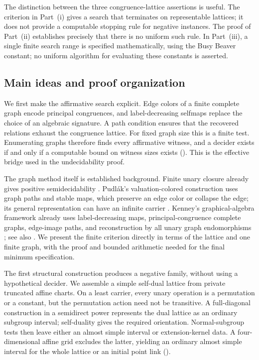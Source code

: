 The distinction between the three congruence-lattice assertions is useful.
The criterion
in Part~\textup{(i)} gives a search that terminates on representable
lattices; it does not provide a computable stopping rule for negative
instances.  The proof of Part~\textup{(ii)} establishes precisely that
there is no uniform such rule.  In Part~\textup{(iii)}, a single finite
search range is specified mathematically, using the Busy Beaver
constant; no uniform algorithm for evaluating these constants is asserted.

\subsection{Main ideas and proof organization}

We first make the affirmative search explicit.  Edge colors of a finite
complete graph encode principal congruences, and label-decreasing
selfmaps replace the choice of an algebraic signature.  A path condition
ensures that the recovered relations exhaust the congruence lattice.
For fixed graph size this is a finite test.  Enumerating graphs therefore
finds every affirmative witness, and a decider exists if and only if a
computable bound on witness sizes exists ().  This is the
effective bridge used in the undecidability proof.

The graph method itself is established background.  Finite unary closure
already gives positive semidecidability
\citep[Section~3.2, Theorem~3.2.1]{DeMeo2012}.  Pudl\'ak's
valuation-colored construction uses graph paths and stable maps, which
preserve an edge color or collapse the edge; its general representation
can have an infinite carrier \citep[pp.~270--272]{Pudlak1976}.
Kenney's graphical-algebra framework already uses label-decreasing maps,
principal-congruence complete graphs, edge-image paths, and reconstruction
by all unary graph endomorphisms
\citep{Kenney2010}; see also \citet[pp.~51--58]{Kenney2009Slides}.
We present the finite criterion directly in terms of the lattice and one
finite graph, with the proof and bounded arithmetic needed for the final
minimum specification.

The first structural construction produces a negative family, without
using a hypothetical decider.  We assemble a simple self-dual lattice
from private truncated affine charts.  On a least carrier, every unary
operation is a permutation or a constant, but the permutation action
need not be transitive.  A full-diagonal construction in a semidirect
power represents the dual lattice as an ordinary subgroup interval;
self-duality gives the required orientation.  Normal-subgroup tests then
leave either an almost simple interval or extension-kernel data.  A
four-dimensional affine grid excludes the latter, yielding an ordinary
almost simple interval for the whole lattice or an initial point link
().

